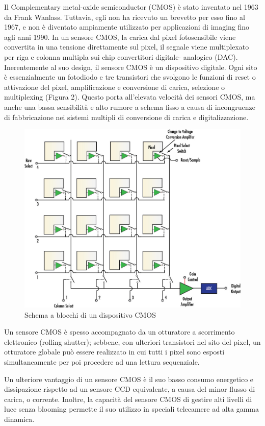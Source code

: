 Il Complementary metal-oxide semiconductor (CMOS) è stato inventato nel 1963
da Frank Wanlass. Tuttavia, egli non ha ricevuto un brevetto per esso fino al
1967, e non è diventato ampiamente utilizzato per applicazioni di imaging fino
agli anni 1990. In un sensore CMOS, la carica dal pixel fotosensibile viene
convertita in una tensione direttamente sul pixel, il segnale viene
multiplexato per riga e colonna multipla sui chip convertitori digitale-
analogico (DAC). Inerentemente al suo design, il sensore CMOS è un dispositivo
digitale. Ogni sito è essenzialmente un fotodiodo e tre transistori che
svolgono le funzioni di reset o attivazione del pixel, amplificazione e
conversione di carica,  selezione o multiplexing (Figura 2). Questo porta
all'elevata velocità dei sensori CMOS, ma anche una bassa sensibilità e alto
rumore a schema fisso a causa di incongruenze di fabbricazione nei sistemi
multipli di conversione di carica e digitalizzazione.
\begin{figure}[!ht]
\centering

\includegraphics[width=.6\textwidth]{img/cmos-blockdiagram.jpeg}

\caption{Schema a blocchi di un dispositivo CMOS}
\label{fig:ccd-blockdiagram}
\end{figure}

Un sensore CMOS è spesso accompagnato da un otturatore a scorrimento
elettronico (rolling shutter); sebbene, con ulteriori transistori nel sito del
pixel, un otturatore globale può essere realizzato in cui tutti i pixel sono
esposti simultaneamente per poi procedere ad una lettura sequenziale.

Un ulteriore vantaggio di un sensore CMOS è il suo basso consumo energetico e
dissipazione rispetto ad un sensore CCD equivalente, a causa del minor flusso
di carica, o corrente. Inoltre, la capacità del sensore CMOS di gestire alti
livelli di luce senza blooming permette il suo utilizzo in speciali telecamere
ad alta gamma dinamica.

